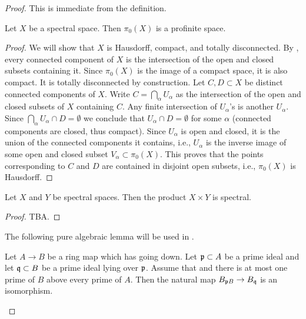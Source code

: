 \begin{proof}
    This is immediate from the definition.

\begin{lemma}
  \label{thm:pi0-profinite}
  Let $X$ be a spectral space. Then $\pi_0(X)$ is a profinite space.
\end{lemma}

\begin{proof}
  We will show that \(X\) is Hausdorff, compact, and totally disconnected.
  By , every connected component of \(X\) is the intersection of the open and closed subsets containing it. Since \(\pi_0(X)\) is the image of a compact space, it is also compact. It is totally disconnected by construction. Let \(C,D \subset X\) be distinct connected components of \(X\). Write \(C = \bigcap_{\alpha} U_\alpha\) as the intersection of the open and closed subsets of \(X\) containing \(C\). Any finite intersection of \(U_\alpha\)'s is another \(U_\alpha\). Since \(\bigcap_\alpha U_\alpha \cap D = \emptyset\) we conclude that \(U_\alpha \cap D = \emptyset\) for some \(\alpha\) (connected components are closed, thus compact). Since \(U_\alpha\) is open and closed, it is the union of the connected components it contains, i.e., \(U_\alpha\) is the inverse image of some open and closed subset \(V_\alpha \subset \pi_0(X)\). This proves that the points corresponding to \(C\) and \(D\) are contained in disjoint open subsets, i.e., \(\pi_0(X)\) is Hausdorff.
\end{proof}

\begin{lemma}
  \label{thm:spectral-product}
  Let $X$ and $Y$ be spectral spaces. Then the product $X \times Y$ is spectral.
\end{lemma}

\begin{proof}
  TBA.
\end{proof}

The following pure algebraic lemma will be used in .

\begin{lemma}
  \label{thm:localization-isom-of-going-down}
  Let $A \to B$ be a ring map which has going down. Let ${\mathfrak{p}} \subset A$ be a prime ideal and let ${\mathfrak{q}} \subset B$ be a prime ideal lying over ${\mathfrak{p}}$. Assume that and there is at most one prime of $B$ above every prime of $A$. Then the natural map $B_{{\mathfrak{p}} B} \to B_{{\mathfrak{q}}}$ is an isomorphism.
\end{lemma}


\end{proof}
